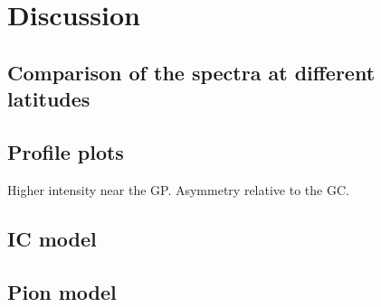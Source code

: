 \section{Discussion}

\subsection{Comparison of the spectra at different latitudes}

\subsection{Profile plots}

Higher intensity near the GP.
Asymmetry relative to the GC.


\subsection{IC model}


\subsection{Pion model}